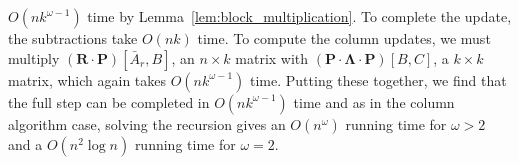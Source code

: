 \documentclass[10pt,a4paper]{article}
\newcommand{\matsize}[2]{#1\times #2}
\newcommand{\matexp}{\omega}
\newcommand{\mat}[1]{\mathbf{#1}}
\newcommand{\Remark}[1]{\textcolor{blue}{[#1]}}
\begin{document}
$O(nk^{\matexp-1})$ time by Lemma~\ref{lem:block_multiplication}. To complete the update, the subtractions take $O(nk)$ time. %
To compute the column updates, 
we must multiply $(\mat{R}\cdot\mat{P})[\bar{A}_r,B]$, an $\matsize{n}{k}$ matrix with  $(\mat{P} \cdot \mat{\Lambda} \cdot \mat{P})[B,C]$, a $\matsize{k}{k}$ matrix, which again takes $O(nk^{\matexp-1})$ time. 
%
Putting these together, we find that the full step can be completed in  $O(nk^{\matexp-1})$ time and as in the column algorithm case, solving the recursion  gives an  $O(n^{\matexp})$ running time for $\matexp>2$ and  a  $O(n^2\log n )$ running time for $\matexp=2$. %


\end{document}

